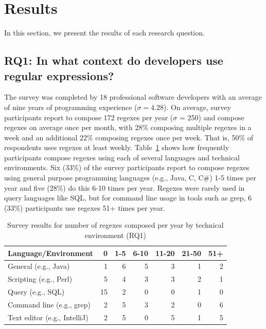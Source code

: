 \section{Results}
\label{sec:results}



In this section, we present the results of each research question.

\subsection{RQ1: In what context do developers use regular expressions?}
\label{rq1:survey}

The survey was completed by 18 professional software developers with an average of nine years of programming experience ($\sigma = 4.28$).
On average, survey participants report to compose 172 regexes per year ($\sigma$ = 250) and compose regexes on average once per month, with 28\% composing multiple regexes in a week and an additional 22\% composing regexes once per week. That is, 50\% of respondents uses regexes at least weekly.
Table~\ref{tab:regexenviron} shows how frequently participants compose regexes using each of several languages and technical environments.
Six (33\%) of the survey participants report to compose regexes using general purpose programming languages (e.g., Java, C, C\#) 1-5 times per year and five (28\%) do this 6-10 times per year.  Regexes were rarely used in query languages like SQL, but for command line usage in tools such as grep, 6 (33\%) participants use regexes 51+ times per year.

\newcommand{\horiz}{\hspace{2.1pt}}

\begin{table}
\caption{Survey results for number of regexes composed per year by technical environment (RQ1) \label{tab:regexenviron}}
\begin{center}
\begin{small}
\begin{tabular}{l | r @{  \horiz} r @{ \horiz } r @{ \horiz } r @{ \horiz } r @{ \horiz } r }
\toprule
\textbf{Language/Environment} & 0 & 1-5 & 6-10 & 11-20 & 21-50 & 51+ \\  \hline \bigstrut
General  (e.g., Java)  & 1 & 6 & 5 & 3& 1& 2 \\ \hline \bigstrut
Scripting  (e.g., Perl) &5 &4 &3 &3 &2  &1 \\ \hline \bigstrut
Query  (e.g., SQL) & 15&2 &0 &0 &1  & 0\\ \hline \bigstrut
Command line (e.g., grep)   &2 &5 &3 &2 &0  &6 \\ \hline \bigstrut
Text editor (e.g., IntelliJ)   & 2& 5& 0& 5& 1& 5\\
\bottomrule
\end{tabular}
\end{small}
\end{center}
\end{table}

